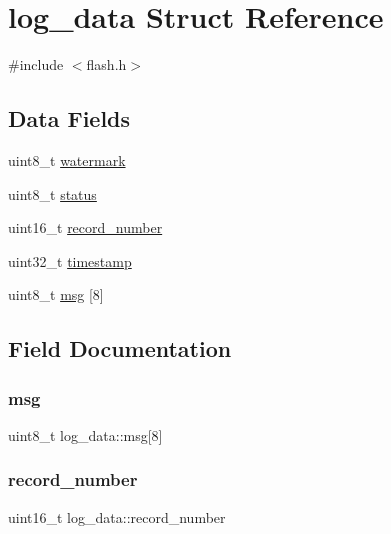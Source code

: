 \hypertarget{structlog__data}{}\section{log\+\_\+data Struct Reference}
\label{structlog__data}


{\ttfamily \#include $<$flash.\+h$>$}

\subsection*{Data Fields}
\begin{DoxyCompactItemize}
\item 
uint8\+\_\+t \hyperlink{structlog__data_a0ba4ca998bb81e9da248dbb13e633ddf}{watermark}
\item 
uint8\+\_\+t \hyperlink{structlog__data_aad2793af491536409cd64e2b4ae1893a}{status}
\item 
uint16\+\_\+t \hyperlink{structlog__data_a02a5c727fa8ad3afe0575f31fe556edb}{record\+\_\+number}
\item 
uint32\+\_\+t \hyperlink{structlog__data_acbe3ab92c413e2d8bdfecd0f2bafdd6b}{timestamp}
\item 
uint8\+\_\+t \hyperlink{structlog__data_af8faaaa77300f4de1e23e460d8a5bab3}{msg} \mbox{[}8\mbox{]}
\end{DoxyCompactItemize}


\subsection{Field Documentation}
\mbox{\label{structlog__data_af8faaaa77300f4de1e23e460d8a5bab3}} 
\subsubsection{\texorpdfstring{msg}{msg}}
{\footnotesize\ttfamily uint8\+\_\+t log\+\_\+data\+::msg\mbox{[}8\mbox{]}}

\mbox{\label{structlog__data_a02a5c727fa8ad3afe0575f31fe556edb}} 
\subsubsection{\texorpdfstring{record\+\_\+number}{record\_number}}
{\footnotesize\ttfamily uint16\+\_\+t log\+\_\+data\+::record\+\_\+number}

